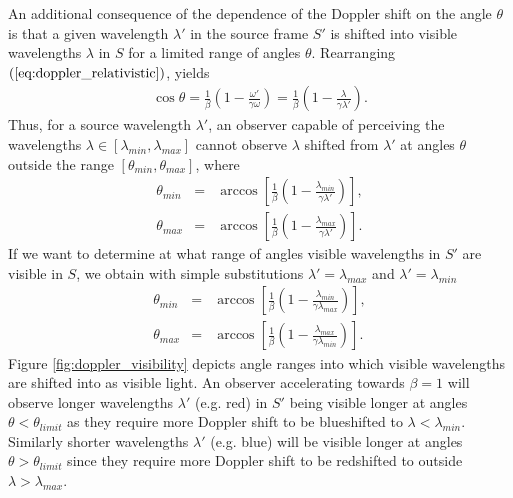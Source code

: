 \documentclass [12pt, a4paper] {article}
\begin{document}
An additional consequence of the dependence of the Doppler shift on the angle 
$\theta$ is that a given wavelength $\lambda'$ in the source frame $S'$ is 
shifted into visible wavelengths $\lambda$
in $S$ for a limited range of angles $\theta$. Rearranging 
$(\ref{eq:doppler_relativistic})$, yields 
\begin {eqnarray}
    \cos\theta
    =
    \frac{1}{\beta}\left(1 - \frac{\omega'}{\gamma\omega}\right)
    =
    \frac{1}{\beta}\left(1 - \frac{\lambda}{\gamma\lambda'}\right).
\end {eqnarray}
Thus, for a source wavelength $\lambda'$, an observer capable of perceiving 
the wavelengths $\lambda\in[\lambda_{min}, \lambda_{max}]$ cannot observe
$\lambda$ shifted from $\lambda'$ at angles $\theta$ outside the range 
$[\theta_{min}, \theta_{max}]$, where 
\begin {eqnarray}
    \label{eq:visible_dopler_min}
    \theta_{min} &=& \arccos\left[
        \frac{1}{\beta}\left(1 - \frac{\lambda_{min}}{\gamma\lambda'}\right)
    \right],
    \\
    \label{eq:visible_dopler_max}
    \theta_{max} &=& \arccos\left[
        \frac{1}{\beta}\left(1 - \frac{\lambda_{max}}{\gamma\lambda'}\right)
    \right].
\end {eqnarray}
If we want to determine at what range of angles visible wavelengths in $S'$ 
are visible in $S$, we obtain with simple substitutions $\lambda'=\lambda_{max}$
and $\lambda'=\lambda_{min}$
\begin {eqnarray}
    \label{eq:visible_dopler_min2}
    \theta_{min} &=& \arccos\left[
        \frac{1}{\beta}\left(1 - \frac{\lambda_{min}}{\gamma\lambda_{max}}\right)
    \right],
    \\
    \label{eq:visible_dopler_max2}
    \theta_{max} &=& \arccos\left[
        \frac{1}{\beta}\left(1 - \frac{\lambda_{max}}{\gamma\lambda_{min}}\right)
    \right].
\end {eqnarray}
Figure \ref{fig:doppler_visibility} depicts angle ranges into which visible wavelengths 
are shifted into as visible light. An observer accelerating towards $\beta=1$ will
observe longer wavelengths $\lambda'$ (e.g. red) in $S'$ being visible longer at 
angles $\theta<\theta_{limit}$ as they require more Doppler shift to be blueshifted 
to $\lambda<\lambda_{min}$. Similarly shorter wavelengths $\lambda'$ (e.g. blue) 
will be visible longer at angles $\theta>\theta_{limit}$ since they require more 
Doppler shift to be redshifted to outside $\lambda>\lambda_{max}$.
\end{document}
